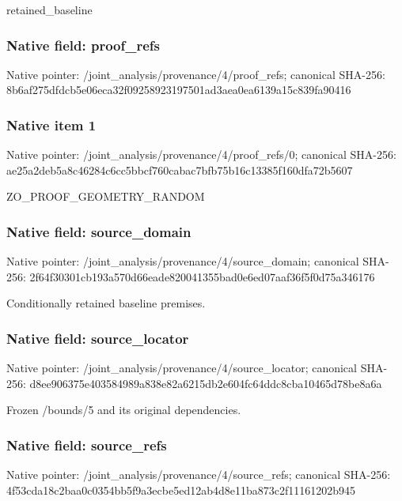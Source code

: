 \documentclass[10pt,a4paper]{article}
\begin{document}
retained\_baseline


\subsubsection{Native field: proof\_refs}


Native pointer: /joint\_analysis/provenance/4/proof\_refs; canonical SHA-256: 8b6af275dfdcb5e06eca32f0\allowbreak{}9258923197501ad3aea0ea61\allowbreak{}39a15c839fa90416



\subsubsection{Native item 1}


Native pointer: /joint\_analysis/provenan\allowbreak{}ce/4/proof\_refs/0; canonical SHA-256: ae25a2deb5a8c46284c6cc5b\allowbreak{}bcf760cabac7bfb75b16c133\allowbreak{}85f160dfa72b5607


ZO\_PROOF\_GEOMETRY\_RANDOM


\subsubsection{Native field: source\_domain}


Native pointer: /joint\_analysis/provenan\allowbreak{}ce/4/source\_domain; canonical SHA-256: 2f64f30301cb193a570d66ea\allowbreak{}de820041355bad0e6ed07aaf\allowbreak{}36f5f0d75a346176


Conditionally retained baseline premises.


\subsubsection{Native field: source\_locator}


Native pointer: /joint\_analysis/provenan\allowbreak{}ce/4/source\_locator; canonical SHA-256: d8ee906375e403584989a838\allowbreak{}e82a6215db2e604fc64ddc8c\allowbreak{}ba10465d78be8a6a


Frozen /bounds/5 and its original dependencies.


\subsubsection{Native field: source\_refs}


Native pointer: /joint\_analysis/provenan\allowbreak{}ce/4/source\_refs; canonical SHA-256: 4f53cda18c2baa0c0354bb5f\allowbreak{}9a3ecbe5ed12ab4d8e11ba87\allowbreak{}3c2f11161202b945
\end{document}

